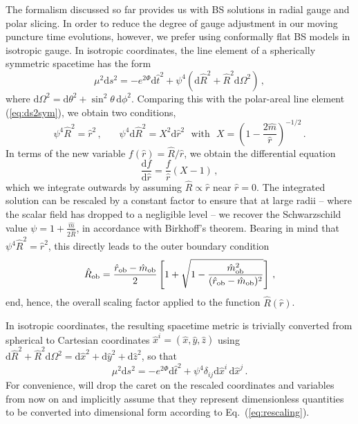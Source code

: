 \documentclass[]{iopart}
\newcommand{\du}{\mathrm{d}}
\begin{document}
The formalism discussed so far provides us with BS solutions in
radial gauge and polar slicing.  In order to reduce the degree of
gauge adjustment in our moving puncture time evolutions, however,
we prefer using conformally flat BS models in isotropic gauge. In
isotropic coordinates, the line element of a spherically symmetric
spacetime has the form
%
\begin{equation}
  \mu^2 \du s^2 = -e^{2\Phi}\du \hat{t}^2+\psi^4 (\du \hat{R}^2
        + \hat{R}^2\du \Omega^2)\,,
  \label{eq:ds2iso}
\end{equation}
%
where $\du \Omega^2=\du\theta^2+\sin^2\theta\,\du \phi^2$. Comparing
this with the polar-areal line element (\ref{eq:ds2sym}), we obtain
two conditions,
%
\begin{equation}
  \psi^4 \hat{R}^2 = \hat{r}^2\,,~~~~~~~~
  \psi^4\du \hat{R}^2=
  X^2 \du \hat{r}^2~~~\text{with}~~~
  X=\left(1-\frac{2\hat{m}}{\hat{r}}\right)^{-1/2}\,.
\end{equation}
%
In terms of the new variable $f(\hat{r})=\hat{R}/\hat{r}$, we obtain
the differential equation
%
\begin{equation}
  \frac{\du f}{\du \hat{r}} = \frac{f}{\hat{r}}(X-1)\,,
\end{equation}
%
which we integrate outwards by assuming $\hat{R}\propto \hat{r}$
near $\hat{r}=0$. The integrated solution can be rescaled by a
constant factor to ensure that at large radii -- where the scalar
field has dropped to a negligible level -- we recover the Schwarzschild
value $\psi = 1+\frac{\hat{m}}{2\hat{R}}$, in accordance with
Birkhoff's theorem.  Bearing in mind that $\psi^4\hat{R}^2=\hat{r}^2$,
this directly leads to the outer boundary condition
%
\begin{equation}
  \hat{R}_{\rm ob} =
  \frac{\hat{r}_{\rm ob}-\hat{m}_{\rm ob}}{2}
  \left[
  1+
  \sqrt{1-\frac{\hat{m}_{\rm ob}^2}{(\hat{r}_{\rm ob}-\hat{m}_{\rm ob})^2}}
  \right]\,,
\end{equation}
%
end, hence, the overall scaling factor applied to the function
$\hat{R}(\hat{r})$.

In isotropic coordinates, the resulting spacetime metric is trivially
converted from spherical to Cartesian coordinates
$\hat{x}^i=(\hat{x},\hat{y},\hat{z})$ using $\du \hat{R}^2 +
\hat{R}^2\du \Omega^2=\du \hat{x}^2+\du \hat{y}^2+\du \hat{z}^2$,
so that
%
\begin{equation}
  \mu^2 \du s^2 = -e^{2\Phi} \du \hat{t}^2 + \psi^4 \delta_{ij}
        \du \hat{x}^i \,\du \hat{x}^j \,.
\end{equation}
%
For convenience, will drop the caret on the rescaled coordinates
and variables from now on and implicitly assume that they represent
dimensionless quantities to be converted into dimensional form
according to Eq.~(\ref{eq:rescaling}).
\end{document}
